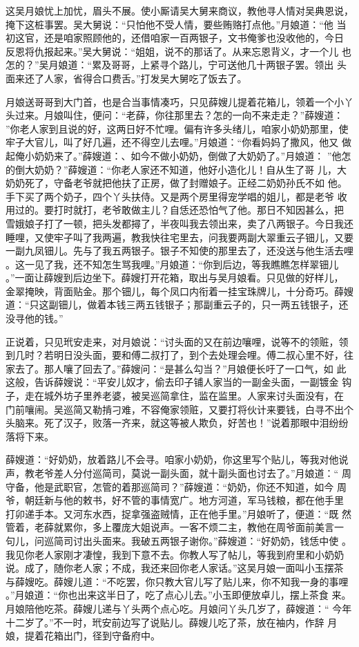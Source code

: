 这吴月娘忧上加忧，眉头不展。使小厮请吴大舅来商议，教他寻人情对吴典恩说，
掩下这桩事罢。吴大舅说：“只怕他不受人情，要些贿赂打点他。”月娘道：“他
当初这官，还是咱家照顾他的，还借咱家一百两银子，文书俺爹也没收他的，今日
反恩将仇报起来。”吴大舅说：“姐姐，说不的那话了。从来忘恩背义，才一个儿
也怎的？”吴月娘道：“累及哥哥，上紧寻个路儿，宁可送他几十两银子罢。领出
头面来还了人家，省得合口费舌。”打发吴大舅吃了饭去了。

月娘送哥哥到大门首，也是合当事情凑巧，只见薛嫂儿提着花箱儿，领着一个小丫
头过来。月娘叫住，便问：“老薛，你往那里去？怎的一向不来走走？”薛嫂道：
”你老人家到且说的好，这两日好不忙哩。偏有许多头绪儿，咱家小奶奶那里，使
牢子大官儿，叫了好几遍，还不得空儿去哩。”月娘道：“你看妈妈了撒风，他又
做起俺小奶奶来了。”薛嫂道：、如今不做小奶奶，倒做了大奶奶了。”月娘道：
”他怎的倒大奶奶？”薛嫂道：“你老人家还不知道，他好小造化儿！自从生了哥
儿，大奶奶死了，守备老爷就把他扶了正房，做了封赠娘子。正经二奶奶孙氏不如
他。手下买了两个奶子，四个丫头扶侍。又是两个房里得宠学唱的姐儿，都是老爷
收用过的。要打时就打，老爷敢做主儿？自恁还恐怕气了他。那日不知因甚么，把
雪娥娘子打了一顿，把头发都撏了，半夜叫我去领出来，卖了八两银子。今日我还
睡哩，又使牢子叫了我两遍，教我快往宅里去，问我要两副大翠重云子钿儿，又要
一副九凤钿儿。先与了我五两银子。银子不知使的那里去了，还没送与他生活去哩
。这一见了我，还不知怎生骂我哩。”月娘道：“你到后边，等我瞧瞧怎样翠钿儿
。”一面让薛嫂到后边坐下。薛嫂打开花箱，取出与吴月娘看。只见做的好样儿，
金翠掩映，背面贴金。那个钿儿，每个凤口内衔着一挂宝珠牌儿，十分奇巧。薛嫂
道：“只这副钿儿，做着本钱三两五钱银子；那副重云子的，只一两五钱银子，还
没寻他的钱。”

正说着，只见玳安走来，对月娘说：“讨头面的又在前边嚷哩，说等不的领赃，领
到几时？若明日没头面，要和傅二叔打了，到个去处理会哩。傅二叔心里不好，往
家去了。那人嚷了回去了。”薛嫂问：“是甚么勾当？”月娘便长吁了一口气，如
此这般，告诉薛嫂说：“平安儿奴才，偷去印子铺人家当的一副金头面，一副镀金
钩子，走在城外坊子里养老婆，被吴巡简拿住，监在监里。人家来讨头面没有，在
门前嚷闹。吴巡简又勒掯刁难，不容俺家领赃，又要打将伙计来要钱，白寻不出个
头脑来。死了汉子，败落一齐来，就这等被人欺负，好苦也！”说着那眼中泪纷纷
落将下来。

薛嫂道：“好奶奶，放着路儿不会寻。咱家小奶奶，你这里写个贴儿，等我对他说
声，教老爷差人分付巡简司，莫说一副头面，就十副头面也讨去了。”月娘道：“
周守备，他是武职官，怎管的着那巡简司？”薛嫂道：“奶奶，你还不知道，如今
周爷，朝廷新与他的敕书，好不管的事情宽广。地方河道，军马钱粮，都在他手里
打卯递手本。又河东水西，捉拿强盗贼情，正在他手里。”月娘听了，便道：“既
然管着，老薛就累你，多上覆庞大姐说声。一客不烦二主，教他在周爷面前美言一
句儿，问巡简司讨出头面来。我破五两银子谢你。”薛嫂道：“好奶奶，钱恁中使
。我见你老人家刚才凄惶，我到下意不去。你教人写了帖儿，等我到府里和小奶奶
说。成了，随你老人家；不成，我还来回你老人家话。”这吴月娘一面叫小玉摆茶
与薛嫂吃。薛嫂儿道：“不吃罢，你只教大官儿写了贴儿来，你不知我一身的事哩
。”月娘道：“你也出来这半日了，吃了点心儿去。”小玉即便放卓儿，摆上茶食
来。月娘陪他吃茶。薛嫂儿递与丫头两个点心吃。月娘问丫头几岁了，薛嫂道：“
今年十二岁了。”不一时，玳安前边写了说贴儿。薛嫂儿吃了茶，放在袖内，作辞
月娘，提着花箱出门，径到守备府中。

